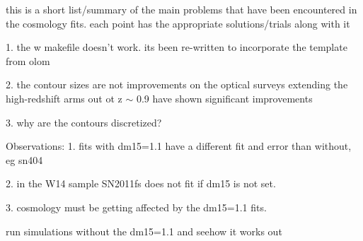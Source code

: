 \documentclass{article}
\begin{document}
this is a short list/summary of the main problems that have been encountered in the cosmology fits. 
each point has the appropriate solutions/trials along with it

1. the w makefile doesn't work.	
	its been re-written to incorporate the template from olom

2. the contour sizes are not improvements on the optical surveys 
	extending the high-redshift arms out ot z $\sim$ 0.9 have shown significant improvements

3. why are the contours discretized?


Observations:
1. fits with dm15=1.1 have a different fit and error than without, eg sn404

2. in the W14 sample SN2011fs does not fit if dm15 is not set. 

3. cosmology must be getting affected by the dm15=1.1 fits. 

run simulations without the dm15=1.1 and seehow it works out 
\end{document}
